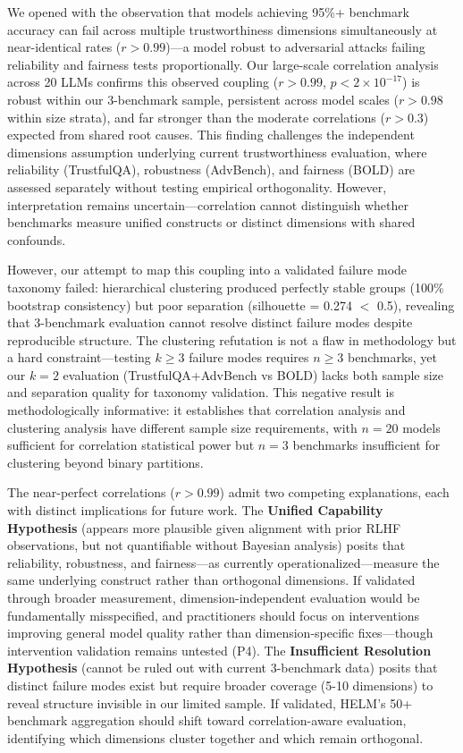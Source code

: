 We opened with the observation that models achieving 95\%+ benchmark accuracy can fail across multiple trustworthiness dimensions simultaneously at near-identical rates ($r > 0.99$)---a model robust to adversarial attacks failing reliability and fairness tests proportionally. Our large-scale correlation analysis across 20 LLMs confirms this observed coupling ($r > 0.99$, $p < 2 \times 10^{-17}$) is robust within our 3-benchmark sample, persistent across model scales ($r > 0.98$ within size strata), and far stronger than the moderate correlations ($r > 0.3$) expected from shared root causes. This finding challenges the independent dimensions assumption underlying current trustworthiness evaluation, where reliability (TrustfulQA), robustness (AdvBench), and fairness (BOLD) are assessed separately without testing empirical orthogonality. However, interpretation remains uncertain---correlation cannot distinguish whether benchmarks measure unified constructs or distinct dimensions with shared confounds.

However, our attempt to map this coupling into a validated failure mode taxonomy failed: hierarchical clustering produced perfectly stable groups (100\% bootstrap consistency) but poor separation (silhouette = 0.274 $<$ 0.5), revealing that 3-benchmark evaluation cannot resolve distinct failure modes despite reproducible structure. The clustering refutation is not a flaw in methodology but a hard constraint---testing $k \geq 3$ failure modes requires $n \geq 3$ benchmarks, yet our $k=2$ evaluation (TrustfulQA+AdvBench vs BOLD) lacks both sample size and separation quality for taxonomy validation. This negative result is methodologically informative: it establishes that correlation analysis and clustering analysis have different sample size requirements, with $n=20$ models sufficient for correlation statistical power but $n=3$ benchmarks insufficient for clustering beyond binary partitions.

The near-perfect correlations ($r > 0.99$) admit two competing explanations, each with distinct implications for future work. The \textbf{Unified Capability Hypothesis} (appears more plausible given alignment with prior RLHF observations, but not quantifiable without Bayesian analysis) posits that reliability, robustness, and fairness---as currently operationalized---measure the same underlying construct rather than orthogonal dimensions. If validated through broader measurement, dimension-independent evaluation would be fundamentally misspecified, and practitioners should focus on interventions improving general model quality rather than dimension-specific fixes---though intervention validation remains untested (P4). The \textbf{Insufficient Resolution Hypothesis} (cannot be ruled out with current 3-benchmark data) posits that distinct failure modes exist but require broader coverage (5-10 dimensions) to reveal structure invisible in our limited sample. If validated, HELM's 50+ benchmark aggregation should shift toward correlation-aware evaluation, identifying which dimensions cluster together and which remain orthogonal.

